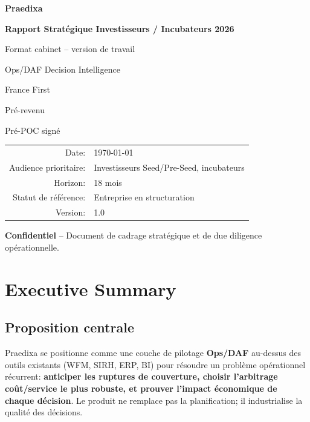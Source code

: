 \documentclass[11pt,a4paper]{article}
\newcommand{\pill}[1]{\colorbox{PraedixaLight}{\strut\hspace{0.45em}\textsf{\small #1}\hspace{0.45em}}}
\begin{document}
\hypersetup{pageanchor=false}

\begin{titlepage}
  \centering
  {\Large \textbf{Praedixa} \par}
  \vspace{3mm}
  {\LARGE \textbf{Rapport Stratégique Investisseurs / Incubateurs 2026} \par}
  \vspace{4mm}
  {\large Format cabinet -- version de travail \par}
  \vspace{8mm}

  \pill{Ops/DAF Decision Intelligence}\hspace{2mm}
  \pill{France First}\hspace{2mm}
  \pill{Pré-revenu}\hspace{2mm}
  \pill{Pré-POC signé}

  \vfill

  \begin{tabular}{rl}
    Date: & \today \\
    Audience prioritaire: & Investisseurs Seed/Pre-Seed, incubateurs \\
    Horizon: & 18 mois \\
    Statut de référence: & Entreprise en structuration \\
    Version: & 1.0
  \end{tabular}

  \vfill

  {\small \textbf{Confidentiel} -- Document de cadrage stratégique et de due diligence opérationnelle.\par}
\end{titlepage}
\hypersetup{pageanchor=true}

\tableofcontents
\newpage
{}

\section{Executive Summary}
\subsection{Proposition centrale}
Praedixa se positionne comme une couche de pilotage \textbf{Ops/DAF} au-dessus des outils existants (WFM, SIRH, ERP, BI) pour résoudre un problème opérationnel récurrent: \textbf{anticiper les ruptures de couverture, choisir l'arbitrage coût/service le plus robuste, et prouver l'impact économique de chaque décision}. Le produit ne remplace pas la planification; il industrialise la qualité des décisions.
\end{document}
